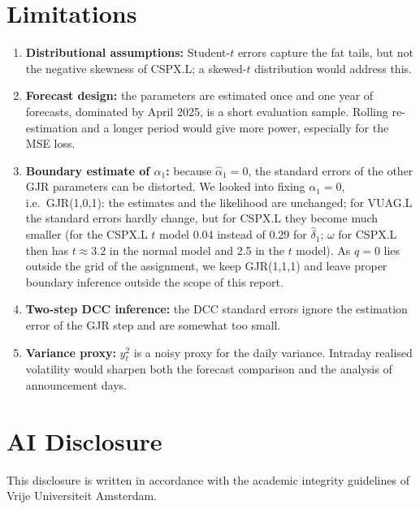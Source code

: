 \documentclass[10pt,a4paper]{article}
\begin{document}
\section{Limitations}\label{sec:limits}
\begin{enumerate}
    \item \textbf{Distributional assumptions:} Student-$t$ errors capture the fat tails, but not the
    negative skewness of CSPX.L; a skewed-$t$ distribution would address this.
    \item \textbf{Forecast design:} the parameters are estimated once and one year of forecasts, dominated
    by April 2025, is a short evaluation sample. Rolling re-estimation and a longer period would give more
    power, especially for the MSE loss.
    \item \textbf{Boundary estimate of $\alpha_1$:} because $\hat\alpha_1=0$, the standard errors of the
    other GJR parameters can be distorted. We looked into fixing $\alpha_1=0$, i.e.\ GJR(1,0,1): the estimates
    and the likelihood are unchanged; for VUAG.L the standard errors hardly change, but for CSPX.L they become much smaller (for the CSPX.L $t$ model
    0.04 instead of 0.29 for $\hat\delta_1$; $\omega$ for CSPX.L then has $t\approx3.2$ in the normal model and 2.5 in the $t$ model). As $q=0$ lies
    outside the grid of the assignment, we keep GJR(1,1,1) and leave proper boundary inference outside the
    scope of this report.
    \item \textbf{Two-step DCC inference:} the DCC standard errors ignore the estimation error of the GJR
    step and are somewhat too small.
    \item \textbf{Variance proxy:} $y_t^2$ is a noisy proxy for the daily variance. Intraday realised
    volatility would sharpen both the forecast comparison and the analysis of announcement days.
\end{enumerate}

\clearpage
\section*{AI Disclosure}
This disclosure is written in accordance with the academic integrity guidelines of Vrije Universiteit Amsterdam.
\end{document}
